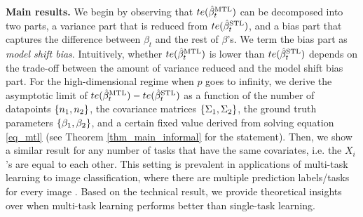 



\textbf{Main results.}
	We begin by observing that $te(\hat{\beta}_t^{\text{MTL}})$ can be decomposed into two parts, a variance part that is reduced from $te(\hat{\beta}_t^{\text{STL}})$, and a bias part that captures the difference between $\beta_t$ and the rest of $\beta$'s.
	We term the bias part as \textit{model shift bias}.
	Intuitively, whether $te(\hat{\beta}_t^{\text{MTL}})$ is lower than $te(\hat{\beta}_t^{\text{STL}})$ depends on the trade-off between the amount of variance reduced and the model shift bias part.
	For the high-dimensional regime when $p$ goes to infinity, we derive the asymptotic limit of $te(\hat{\beta}_t^{\text{MTL}}) - te(\hat{\beta}_t^{\text{STL}})$ as a function of the number of datapoints $\{n_1, n_2\}$, the covariance matrices $\{\Sigma_1, \Sigma_2\}$, the ground truth parameters $\{\beta_1, \beta_2\}$, and a certain fixed value derived from solving equation \eqref{eq_mtl} (see Theorem \ref{thm_main_informal} for the statement).
	Then, we show a similar result for any number of tasks that have the same covariates, i.e. the $X_i$'s are equal to each other.
	This setting is prevalent in applications of multi-task learning to image classification, where there are multiple prediction labels/tasks for every image \cite{chexnet17,EA20}.
	Based on the technical result, we provide theoretical insights over when multi-task learning performs better than single-task learning.

